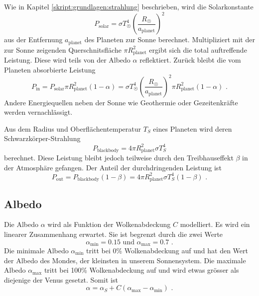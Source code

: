 \begin{refsection}
Wie in Kapitel \ref{skript:grundlagen:strahlung} beschrieben, wird die Solarkonstante
\begin{equation}
P_{\text{solar}} = \sigma T_{\astrosun}^4 \left( \frac{R_{\astrosun}}{a_{\text{planet}}} \right) ^2
\end{equation}
aus der Entfernung $a_{\text{planet}}$ des Planeten zur Sonne berechnet. Multipliziert mit der zur Sonne zeigenden Querschnitsfläche $\pi R_{\text{planet}}^2$ ergibt sich die total auftreffende Leistung. Diese wird teils von der Albedo $\alpha$ reflektiert. Zurück bleibt die vom Planeten absorbierte Leistung \begin{equation}
P_{\text{in}} = P_{\text{solar}}  \pi R_{\text{planet}}^2 (1-\alpha) = \sigma T_{\astrosun}^4 \left( \frac{R_{\astrosun}}{a_{\text{planet}}} \right) ^2 \pi R_{\text{planet}}^2 (1-\alpha)\text{ .}
\end{equation}
Andere Energiequellen neben der Sonne wie Geothermie oder Gezeitenkräfte werden vernachlässigt.

Aus dem Radius und Oberflächentemperatur $T_{S}$ eines Planeten wird deren Schwarzkörper-Strahlung \begin{equation}
P_{\text{blackbody}} = 4 \pi R_{\text{planet}}^2 \sigma T_{S}^4
\end{equation}
berechnet. Diese Leistung bleibt jedoch teilweise durch den Treibhauseffekt $\beta$ in der Atmosphäre gefangen. Der Anteil der durchdringenden Leistung ist
\begin{equation}
P_{\text{out}} = P_{\text{blackbody}} (1 - \beta) = 4 \pi R_{\text{planet}}^2 \sigma T_{S}^4 (1 - \beta)\text{ .}
\end{equation}

\subsection{Albedo}
Die Albedo $\alpha$ wird als Funktion der Wolkenabdeckung $C$ modelliert. Es wird ein linearer Zusammenhang erwartet. Sie ist begrenzt durch die zwei Werte
\begin{equation}
\alpha_{\text{min}} = 0.15 \text{ und } \alpha_{\text{max}} = 0.7 \text{ .}
\end{equation}
Die minimale Albedo $\alpha_{\text{min}}$ tritt bei 0\% Wolkenabdeckung auf und hat den Wert der Albedo des Mondes, der kleinsten in unserem Sonnensystem. Die maximale Albedo $\alpha_{\text{max}}$ tritt bei 100\% Wolkenabdeckung auf und wird etwas grösser als diejenige der Venus gesetzt. Somit ist
\begin{equation}
\alpha = \alpha_S + C(\alpha_{\text{max}} - \alpha_{\text{min}}) \text{ .}
\end{equation}


\end{refsection}
